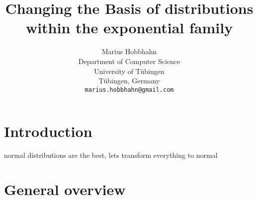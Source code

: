 \documentclass{article}
\title{Changing the Basis of distributions within the exponential family}
\author{%
  Marius Hobbhahn \\
  Department of Computer Science\\
  University of Tübingen\\
  Tübingen, Germany \\
  \texttt{marius.hobbhahn@gmail.com} \\
}
\begin{document}
\maketitle


\section{Introduction}

normal distributions are the best, lets transform everything to normal





\section{General overview}
\end{document}
